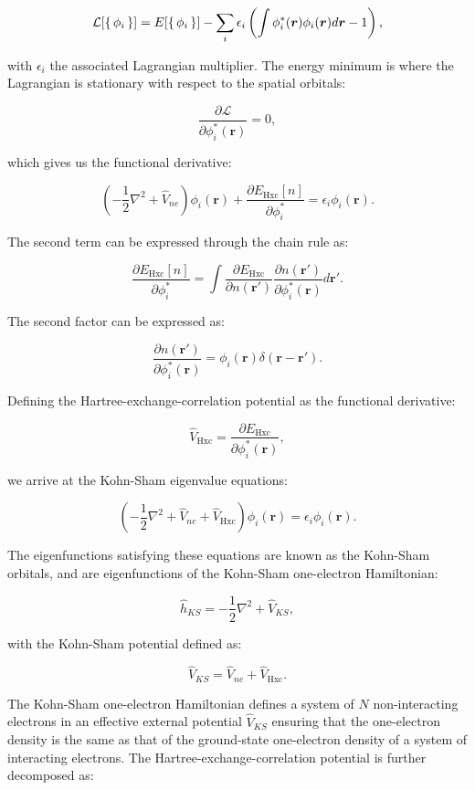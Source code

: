 $$ \mathcal{L} [\set{\phi_i}]
    = E[\set{\phi_i}] - \sum_i \epsilon_i
    \left( \int \phi_i^* (\bm{r}) \phi_i(\bm{r}) d\bm{r} - 1 \right) , $$

with $\epsilon_i$ the associated Lagrangian multiplier.
The energy minimum is where the Lagrangian is stationary
with respect to the spatial orbitals:

$$ \frac{\partial \mathcal{L}}{\partial \phi_i^* (\bm{r})} = 0 , $$

which gives us the functional derivative:

$$ \left( -\frac{1}{2} \nabla^2 + \hat{V}_{ne} \right) \phi_i(\bm{r})
    + \frac{\partial E_{\text{Hxc}}[n]}{\partial \phi_i^*} 
    = \epsilon_i \phi_i(\bm{r}) . $$

The second term can be expressed through the chain rule as:

$$ \frac{\partial E_{\text{Hxc}}[n]}{\partial \phi_i^*} =
    \int \frac{\partial E_{\text{Hxc}}}{\partial n(\bm{r}')}
    \frac{\partial n(\bm{r}')}{\partial \phi_i^*(\bm{r})} d\bm{r}' .
$$

The second factor can be expressed as:

$$ \frac{\partial n(\bm{r}')}{\partial \phi_i^*(\bm{r})}
    = \phi_i(\bm{r}) \delta (\bm{r} - \bm{r}') .
$$

Defining the Hartree-exchange-correlation potential as the functional
derivative:

$$ \hat{V}_{\text{Hxc}} = \frac{\partial E_{\text{Hxc}}}{\partial
    \phi_i^*(\bm{r})} , $$

we arrive at the Kohn-Sham eigenvalue equations:

$$ \left( -\frac{1}{2} \nabla^2 + \hat{V}_{ne} + \hat{V}_{\text{Hxc}}
    \right) \phi_i(\bm{r}) = \epsilon_i \phi_i (\bm{r}) . $$

The eigenfunctions satisfying these equations are known as the
Kohn-Sham orbitals, and are eigenfunctions of the Kohn-Sham
one-electron Hamiltonian:

$$ \hat{h}_{KS} = - \frac{1}{2} \nabla^2 + \hat{V}_{KS} , $$

with the Kohn-Sham potential defined as:

$$ \hat{V}_{KS} = \hat{V}_{ne} + \hat{V}_{\text{Hxc}} . $$

The Kohn-Sham one-electron Hamiltonian defines a system of $N$
non-interacting electrons in an effective external potential
$\hat{V}_{KS}$ ensuring that the one-electron density
is the same as that of the ground-state one-electron density
of a system of interacting electrons.
The Hartree-exchange-correlation potential is further
decomposed as:

